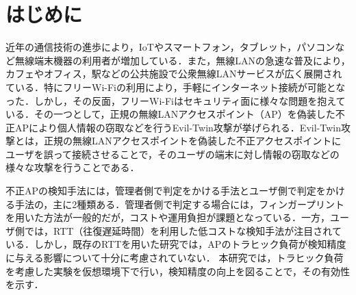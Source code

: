 \documentclass[twocolumn, a4paper]{ieicejsp}
\begin{document}
\fontsize{9}{9}\selectfont
{}
  
\section{はじめに}
近年の通信技術の進歩により，IoTやスマートフォン，タブレット，パソコンなど無線端末機器の利用者が増加している\cite{総務省2020令和}．また，無線LANの急速な普及により，カフェやオフィス，駅などの公共施設で公衆無線LANサービスが広く展開されている．特にフリーWi-Fiの利用により，手軽にインターネット接続が可能となった．しかし，その反面，フリーWi-Fiはセキュリティ面に様々な問題を抱えている．その一つとして，正規の無線LANアクセスポイント（AP）を偽装した不正APにより個人情報の窃取などを行うEvil-Twin攻撃が挙げられる．Evil-Twin攻撃とは，正規の無線LANアクセスポイントを偽装した不正アクセスポイントにユーザを誤って接続させることで，そのユーザの端末に対し情報の窃取などの様々な攻撃を行うことである．\par
不正APの検知手法には，管理者側で判定をかける手法\cite{10367998}とユーザ側で判定をかける手法\cite{9405821}の，主に2種類ある．管理者側で判定する場合には，フィンガープリントを用いた方法が一般的だが，コストや運用負担が課題となっている．一方，ユーザ側では，RTT（往復遅延時間）を利用した低コストな検知手法が注目されている．しかし，既存のRTTを用いた研究では，APのトラヒック負荷が検知精度に与える影響について十分に考慮されていない．
本研究では，トラヒック負荷を考慮した実験を仮想環境下で行い，検知精度の向上を図ることで，その有効性を示す．
\end{document}
